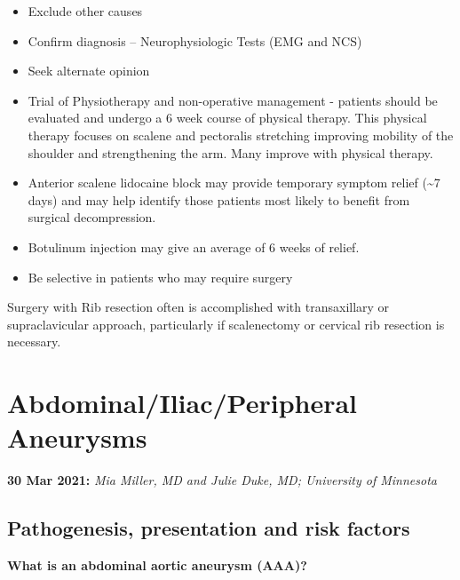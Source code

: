 \documentclass[
]{book}
\begin{document}
\begin{itemize}
\item
  Exclude other causes
\item
  Confirm diagnosis -- Neurophysiologic Tests (EMG and NCS)
\item
  Seek alternate opinion
\item
  Trial of Physiotherapy and non-operative management - patients
  should be evaluated and undergo a 6 week course of physical therapy.
  This physical therapy focuses on scalene and pectoralis stretching
  improving mobility of the shoulder and strengthening the arm. Many
  improve with physical therapy.
  \citep{baldermanPhysicalTherapyManagement2019}
\item
  Anterior scalene lidocaine block may provide temporary symptom
  relief (\textasciitilde7 days) and may help identify those patients most likely
  to benefit from surgical decompression.
  \citep{salhanPC214UltrasoundGuidedAnesthetic2016, lumImpactAnteriorScalene2012}
\item
  Botulinum injection may give an average of 6 weeks of relief.
  \citep{salhanPC214UltrasoundGuidedAnesthetic2016}
\item
  Be selective in patients who may require surgery
\end{itemize}

Surgery with Rib resection often is accomplished with transaxillary or
supraclavicular approach, particularly if scalenectomy or cervical rib
resection is necessary.

\hypertarget{abdominaliliacperipheral-aneurysms}{%
\chapter{Abdominal/Iliac/Peripheral Aneurysms}\label{abdominaliliacperipheral-aneurysms}}

\textbf{30 Mar 2021:} \emph{Mia Miller, MD and Julie Duke, MD; University of
Minnesota}

\hypertarget{pathogenesis-presentation-and-risk-factors}{%
\section{Pathogenesis, presentation and risk factors}\label{pathogenesis-presentation-and-risk-factors}}

\textbf{What is an abdominal aortic aneurysm (AAA)?}
\citep{mooreVascularEndovascularSurgery2019}
\end{document}

